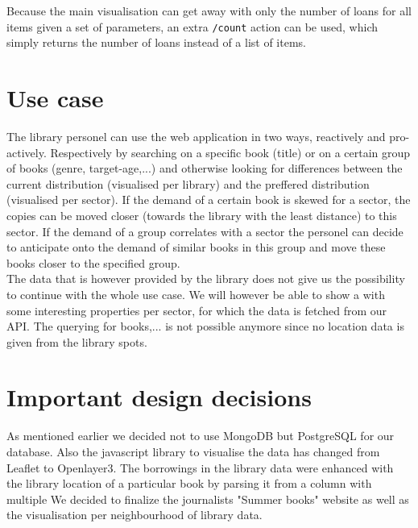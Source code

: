 Because the main visualisation can get away with only the number of loans for all items given a set of parameters, an extra \texttt{/count} action can be used, which simply returns the number of loans instead of a list of items.

\section{Use case}

The library personel can use the web application in two ways, reactively and pro-actively. Respectively by searching on a specific book (title) or on a certain group of books (genre, target-age,...) and otherwise looking for differences between the current distribution (visualised per library) and the preffered distribution (visualised per sector). If the demand of a certain book is skewed for a sector, the copies can be moved closer (towards the library with the least distance) to this sector. If the demand of a group correlates with a sector the personel can decide to anticipate onto the demand of similar books in this group and move these books closer to the specified group.\\

The data that is however provided by the library does not give us the possibility to continue with the whole use case. We will however be able to show a with some interesting properties per sector, for which the data is fetched from our API. The querying for books,... is not possible anymore since no location data is given from the library spots.

\section{Important design decisions}

As mentioned earlier we decided not to use MongoDB but PostgreSQL for our database.
Also the javascript library to visualise the data has changed from Leaflet to Openlayer3.
The borrowings in the library data were enhanced with the library location of a particular book by parsing it from a column with multiple
We decided to finalize the journalists "Summer books" website as well as the visualisation per neighbourhood of library data.

